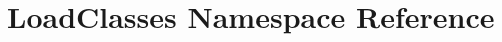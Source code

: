 \hypertarget{namespaceLoadClasses}{\section{Load\-Classes Namespace Reference}
\label{namespaceLoadClasses}
}
